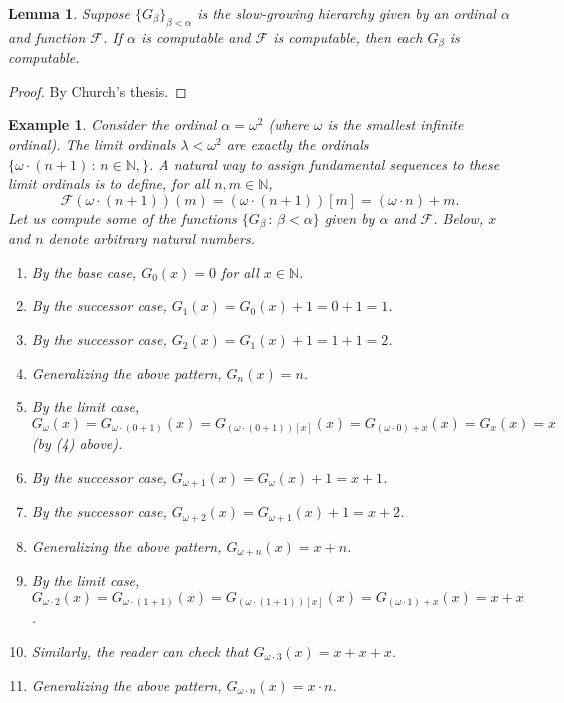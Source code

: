 \documentclass{article}
\newtheorem{example}[theorem]{Example}
\newtheorem{lemma}[theorem]{Lemma}
\begin{document}
\begin{lemma}
    Suppose $\{G_\beta\}_{\beta<\alpha}$ is the slow-growing hierarchy given by
    an ordinal $\alpha$ and function $\mathcal F$.
    If $\alpha$ is computable and $\mathcal F$ is computable,
    then each $G_\beta$ is computable.
\end{lemma}

\begin{proof}
By Church's thesis.
\end{proof}

\begin{example}
    Consider the ordinal $\alpha=\omega^2$ (where $\omega$ is the smallest infinite
    ordinal).
    The limit ordinals $\lambda<\omega^2$ are exactly the ordinals
    $\{\omega\cdot (n+1)\,:\,n\in\mathbb N,\}$.
    A natural way to assign fundamental sequences to these limit ordinals is to define,
    for all $n,m\in\mathbb N$,
    \[
        \mathcal F(\omega\cdot(n+1))(m) = (\omega\cdot(n+1))[m] = (\omega\cdot n)+m.
    \]
    Let us compute some of the functions $\{G_{\beta}\,:\,\beta<\alpha\}$
    given by $\alpha$ and $\mathcal F$. Below, $x$ and $n$
    denote arbitrary natural numbers.
    \begin{enumerate}
        \item
        By the base case, $G_0(x)=0$ for all $x\in\mathbb N$.
        \item
        By the successor case, $G_1(x)=G_0(x)+1=0+1=1$.
        \item
        By the successor case, $G_2(x)=G_1(x)+1=1+1=2$.
        \item
        Generalizing the above pattern, $G_n(x)=n$.
        \item
        By the limit case,
        $G_\omega(x)=G_{\omega\cdot(0+1)}(x)
        =G_{(\omega\cdot(0+1))[x]}(x)=G_{(\omega\cdot 0)+x}(x)
        =G_x(x)=x$ (by (4) above).
        \item
        By the successor case, $G_{\omega+1}(x)=G_{\omega}(x)+1=x+1$.
        \item
        By the successor case, $G_{\omega+2}(x)=G_{\omega+1}(x)+1=x+2$.
        \item
        Generalizing the above pattern, $G_{\omega+n}(x)=x+n$.
        \item
        By the limit case,
        $G_{\omega\cdot 2}(x)=G_{\omega\cdot(1+1)}(x)
        =G_{(\omega\cdot(1+1))[x]}(x)=G_{(\omega\cdot 1)+x}(x)
        =x+x$.
        \item
        Similarly, the reader can check that $G_{\omega\cdot 3}(x)=x+x+x$.
        \item
        Generalizing the above pattern, $G_{\omega\cdot n}(x)=x\cdot n$.
    \end{enumerate}
\end{example}
\end{document}
